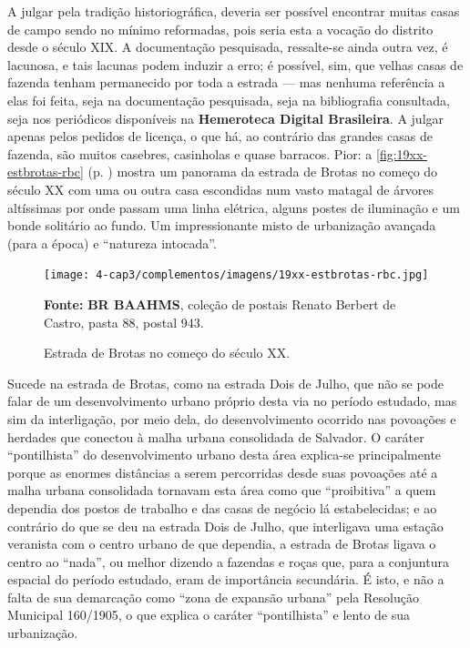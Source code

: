 
A julgar pela tradição historiográfica, deveria ser possível encontrar muitas casas de campo sendo no mínimo reformadas, pois seria esta a vocação do distrito desde o século XIX. A documentação pesquisada, ressalte-se ainda outra vez, é lacunosa, e tais lacunas podem induzir a erro; é possível, sim, que velhas casas de fazenda tenham permanecido por toda a estrada --- mas nenhuma referência a elas foi feita, seja na documentação pesquisada, seja na bibliografia consultada, seja nos periódicos disponíveis na \textbf{Hemeroteca Digital Brasileira}. A julgar apenas pelos pedidos de licença, o que há, ao contrário das grandes casas de fazenda, são muitos casebres, casinholas e quase barracos. Pior: a \autoref{fig:19xx-estbrotas-rbc} (p. \pageref{fig:19xx-estbrotas-rbc}) mostra um panorama da estrada de Brotas no começo do século XX com uma ou outra casa escondidas num vasto matagal de árvores altíssimas por onde passam uma linha elétrica, alguns postes de iluminação e um bonde solitário ao fundo. Um impressionante misto de urbanização avançada (para a época) e ``natureza intocada''. 

\begin{figure}[!h]
\centering
\caption{Estrada de Brotas no começo do século XX.}
\texttt{[image: 4-cap3/complementos/imagens/19xx-estbrotas-rbc.jpg]}{\footnotesize \par \textbf{Fonte:} \textbf{BR BAAHMS}, coleção de postais Renato Berbert de Castro, pasta 88, postal 943.}
\label{fig:19xx-estbrotas-rbc}
\end{figure}

Sucede na estrada de Brotas, como na estrada Dois de Julho, que não se pode falar de um desenvolvimento urbano próprio desta via no período estudado, mas sim da interligação, por meio dela, do desenvolvimento ocorrido nas povoações e herdades que conectou à malha urbana consolidada de Salvador. O caráter ``pontilhista'' do desenvolvimento urbano desta área explica-se principalmente porque as enormes distâncias a serem percorridas desde suas povoações até a malha urbana consolidada tornavam esta área como que ``proibitiva'' a quem dependia dos postos de trabalho e das casas de negócio lá estabelecidas; e ao contrário do que se deu na estrada Dois de Julho, que interligava uma estação veranista com o centro urbano de que dependia, a estrada de Brotas ligava o centro ao ``nada'', ou melhor dizendo a fazendas e roças que, para a conjuntura espacial do período estudado, eram de importância secundária. É isto, e não a falta de sua demarcação como ``zona de expansão urbana'' pela Resolução Municipal 160/1905, o que explica o caráter ``pontilhista'' e lento de sua urbanização.

